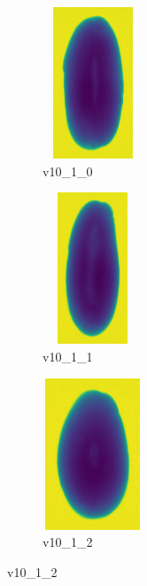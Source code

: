 \documentclass[11pt]{article}
\begin{document}

\begin{figure}
     \centering
     \begin{subfigure}[b]{0.15\textwidth}
         \centering
         \includegraphics[width=3cm, height=4.5cm]{images/kartofler/v10_1_0_cut.png}
         \caption{v10\_1\_0}
         \label{fig:y equals x}
     \end{subfigure}
     \hfill
     \begin{subfigure}[b]{0.15\textwidth}
         \centering
         \includegraphics[width=3cm, height=4.5cm]{images/kartofler/v10_1_1_cut.png}
        \caption{v10\_1\_1}
         \label{fig:three sin x}
     \end{subfigure}
     \hfill
     \begin{subfigure}[b]{0.15\textwidth}
         \centering
         \includegraphics[width=3cm, height=4.5cm]{images/kartofler/v10_1_2_cut.png}
        \caption{v10\_1\_2}
         \label{fig:five over x}
     \end{subfigure}

\end{figure}
\end{document}
